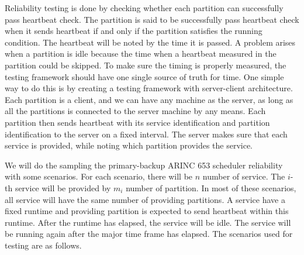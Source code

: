 \documentclass[conference]{IEEEtran}
\begin{document}
Reliability testing is done by checking whether each partition can successfully pass heartbeat
check. The partition is said to be successfully pass heartbeat check when it sends heartbeat if
and only if the partition satisfies the running condition. The heartbeat will be noted by the
time it is passed. A problem arises when a partition is idle because the time when a heartbeat
measured in the partition could be skipped. To make sure the timing is properly measured, the
testing framework should have one single source of truth for time. One simple way to do this is
by creating a testing framework with server-client architecture. Each partition is a client, and
we can have any machine as the server, as long as all the partitions is connected to the server
machine by any means. Each partition then sends heartbeat with its service identification and
partition identification to the server on a fixed interval. The server makes sure that each
service is provided, while noting which partition provides the service.

We will do the sampling the primary-backup ARINC 653 scheduler reliability with some scenarios.
For each scenario, there will be $n$ number of service. The $i$-th service will be provided by
$m_i$ number of partition. In most of these scenarios, all service will have the same number of
providing partitions. A service have a fixed runtime and providing partition is expected to send
heartbeat within this runtime. After the runtime has elapsed, the service will be idle. The
service will be running again after the major time frame has elapsed. The scenarios used for
testing are as follows.
\end{document}
